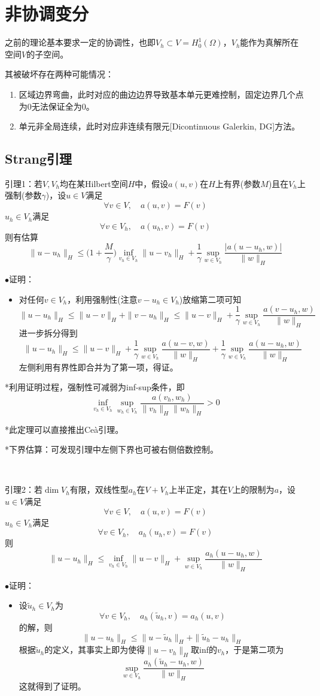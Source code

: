 \documentclass[a4paper,UTF8,fontset=windows]{ctexart}
\newcommand{\proo}[1]{{\kaishu $\bullet$证明：
\begin{itemize}
    \item[] #1
\end{itemize}
}}
\begin{document}
\section{非协调变分}
之前的理论基本要求一定的协调性，也即$V_h\subset V=H_0^1(\Omega)$，$V_h$能作为真解所在空间$V$的子空间。

其被破坏存在两种可能情况：
\begin{enumerate}
    \item 区域边界弯曲，此时对应的曲边边界导致基本单元更难控制，固定边界几个点为0无法保证全为0。
    \item 单元非全局连续，此时对应非连续有限元[Dicontinuous Galerkin, DG]方法。
\end{enumerate}

\subsection{Strang引理}
引理1：若$V,V_h$均在某Hilbert空间$H$中，假设$a(u,v)$在$H$上有界(参数$M$)且在$V_h$上强制(参数$\gamma$)，设$u\in V$满足
$$\forall v\in V,\quad a(u,v)=F(v)$$
$u_h\in V_h$满足
$$\forall v\in V_h,\quad a(u_h,v)=F(v)$$
则有估算
$$\|u-u_h\|_H\le\bigg(1+\frac{M}{\gamma}\bigg)\inf_{v_h\in V_h}\|u-v_h\|_H+\frac{1}{\gamma}\sup_{w\in V_h}\frac{|a(u-u_h,w)|}{\|w\|_H}$$
\proo{
    对任何$v\in V_h$，利用强制性(注意$v-u_h\in V_h$)放缩第二项可知
    $$\|u-u_h\|_H\le\|u-v\|_H+\|v-u_h\|_H\le\|u-v\|_H+\frac{1}{\gamma}\sup_{w\in V_h}\frac{a(v-u_h,w)}{\|w\|_H}$$
    进一步拆分得到
    $$\|u-u_h\|_H\le\|u-v\|_H+\frac{1}{\gamma}\sup_{w\in V_h}\frac{a(u-v,w)}{\|w\|_H}+\frac{1}{\gamma}\sup_{w\in V_h}\frac{a(u-u_h,w)}{\|w\|_H}$$
    左侧利用有界性即合并为了第一项，得证。
}

*利用证明过程，强制性可减弱为inf-sup条件，即
$$\inf_{v_h\in V_h}\sup_{w_h\in V_h}\frac{a(v_h,w_h)}{\|v_h\|_H\|w_h\|_H}>0$$

*此定理可以直接推出Ce\`a引理。

*下界估算：可发现引理中左侧下界也可被右侧倍数控制。

\

引理2：若$\dim V_h$有限，双线性型$a_h$在$V+V_h$上半正定，其在$V$上的限制为$a$，设$u\in V$满足
$$\forall v\in V,\quad a(u,v)=F(v)$$
$u_h\in V_h$满足
$$\forall v\in V_h,\quad a_h(u_h,v)=F(v)$$
则
$$\|u-u_h\|_H\le\inf_{v_h\in V_h}\|u-v\|_H+\sup_{w\in V_h}\frac{a_h(u-u_h,w)}{\|w\|_H}$$

\proo{
    设$\tilde{u}_h\in V_h$为
    $$\forall v\in V_h,\quad a_h(\tilde{u}_h,v)=a_h(u,v)$$
    的解，则
    $$\|u-u_h\|_H\le\|u-\tilde{u}_h\|_H+\|\tilde{u}_h-u_h\|_H$$
    根据$\tilde{u}_h$的定义，其事实上即为使得$\|u-v_h\|_H$取inf的$v_h$，于是第二项为
    $$\sup_{w\in V_h}\frac{a_h(\tilde{u}_h-u_h,w)}{\|w\|_H}$$
    这就得到了证明。
}
\end{document}
